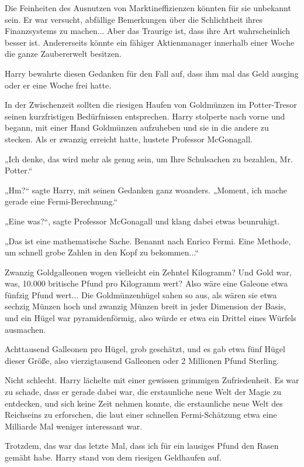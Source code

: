 {Die Feinheiten des Ausnutzen von Marktineffizienzen könnten für sie unbekannt sein. Er war versucht, abfällige Bemerkungen über die Schlichtheit ihres Finanzsystems zu machen... Aber das Traurige ist, dass ihre Art wahrscheinlich besser ist. Andererseits könnte ein fähiger Aktienmanager innerhalb einer Woche die ganze Zaubererwelt besitzen.

Harry bewahrte diesen Gedanken für den Fall auf, dass ihm mal das Geld ausging oder er eine Woche frei hatte.

In der Zwischenzeit sollten die riesigen Haufen von Goldmünzen im Potter-Tresor seinen kurzfristigen Bedürfnissen entsprechen. Harry stolperte nach vorne und begann, mit einer Hand Goldmünzen aufzuheben und sie in die andere zu stecken. Als er zwanzig erreicht hatte, hustete Professor McGonagall.

„Ich denke, das wird mehr als genug sein, um Ihre Schulsachen zu bezahlen, Mr. Potter.“

„Hm?“ sagte Harry, mit seinen Gedanken ganz woanders. „Moment, ich mache gerade eine Fermi-Berechnung.“

„Eine was?“, sagte Professor McGonagall und klang dabei etwas beunruhigt.

„Das ist eine mathematische Sache. Benannt nach Enrico Fermi. Eine Methode, um schnell grobe Zahlen in den Kopf zu bekommen...“

Zwanzig Goldgalleonen wogen vielleicht ein Zehntel Kilogramm? Und Gold war, was, 10.000 britische Pfund pro Kilogramm wert? Also wäre eine Galeone etwa fünfzig Pfund wert... Die Goldmünzenhügel sahen so aus, als wären sie etwa sechzig Münzen hoch und zwanzig Münzen breit in jeder Dimension der Basis, und ein Hügel war pyramidenförmig, also würde er etwa ein Drittel eines Würfels ausmachen.

Achttausend Galleonen pro Hügel, grob geschätzt, und es gab etwa fünf Hügel dieser Größe, also vierzigtausend Galleonen oder 2 Millionen Pfund Sterling.

Nicht schlecht. Harry lächelte mit einer gewissen grimmigen Zufriedenheit. Es war zu schade, dass er gerade dabei war, die erstaunliche neue Welt der Magie zu entdecken, und sich keine Zeit nehmen konnte, die erstaunliche neue Welt des Reichseins zu erforschen, die laut einer schnellen Fermi-Schätzung etwa eine Milliarde Mal weniger interessant war.

Trotzdem, das war das letzte Mal, dass ich für ein lausiges Pfund den Rasen gemäht habe. Harry stand von dem riesigen Geldhaufen auf.

}
